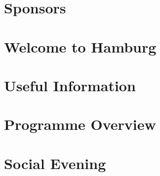 \documentclass[openany, parskip=full, 12pt, a4]{scrbook}
\begin{document}

	
	



\chapter{Sponsors}



\chapter{Welcome to Hamburg}



\tableofcontents


\chapter{Useful Information}



\chapter{Programme Overview}



\chapter{Social Evening}




\end{document}
